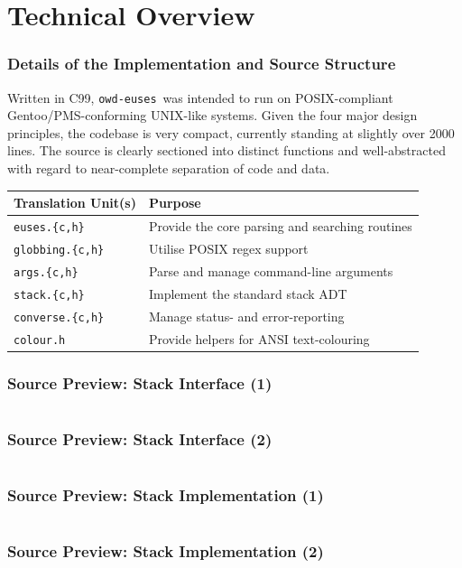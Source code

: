 \documentclass{beamer}
\numberwithin{figure}{section}
\newcommand\chext{.{\fontfamily{cmr}\{}c,h{\fontfamily{cmr}\}}}
\newcounter{firstsrcline}
\newcounter{lastsrcline}
\newcommand\srclinelimit{29}
\newcommand\resetsrclines{%
    \setcounter{firstsrcline}{1}
    \setcounter{lastsrcline}{\thefirstsrcline+\srclinelimit}
}
\newcommand\continuesource[1]{%
    \inputminted[firstline=\thefirstsrcline, lastline=\thelastsrcline,
        firstnumber=\thefirstsrcline]{c}{listings/#1}
    \setcounter{firstsrcline}{\thelastsrcline+1}
    \setcounter{lastsrcline}{\thefirstsrcline+\srclinelimit}
}
\newcommand\programname{\texttt{owd-euses}}
\begin{document}
\section{Technical Overview}
\begin{frame}
    \frametitle{Details of the Implementation and Source Structure}
    Written in C99, \programname\ was intended to run on POSIX-compliant
    Gentoo/PMS-conforming UNIX-like systems. Given the four major design
    principles, the codebase is very compact, currently standing at slightly
    over 2000 lines. The source is clearly sectioned into distinct functions and
    well-abstracted with regard to near-complete separation of code and data.
    \pause

    \begin{center}
        \begin{tabular}{ll}
            \hline
            \textbf{Translation Unit(s)} & \textbf{Purpose} \\
            \hline
            \texttt{euses\chext} & Provide the core parsing and searching
                routines \\
            \texttt{globbing\chext} & Utilise POSIX regex support \\
            \texttt{args\chext} & Parse and manage command-line arguments \\
            \texttt{stack\chext} & Implement the standard stack ADT \\
            \texttt{converse\chext} & Manage status- and error-reporting \\
            \texttt{colour.h} & Provide helpers for ANSI text-colouring \\
            \hline
        \end{tabular}
    \end{center}
\end{frame}
\begin{frame}
    \frametitle{Source Preview: Stack Interface (1)}
    \resetsrclines
    \continuesource{stack.h}
\end{frame}
\begin{frame}
    \frametitle{Source Preview: Stack Interface (2)}
    \continuesource{stack.h}
\end{frame}
\begin{frame}
    \frametitle{Source Preview: Stack Implementation (1)}
    \resetsrclines
    \continuesource{stack.c}
\end{frame}
\begin{frame}
    \frametitle{Source Preview: Stack Implementation (2)}
    \continuesource{stack.c}
\end{frame}
\end{document}
